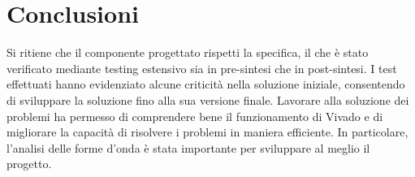 \documentclass{article}
\begin{document}
\section{Conclusioni}

Si ritiene che il componente progettato rispetti la specifica, il che è stato verificato mediante testing estensivo sia in pre-sintesi che in post-sintesi. I test effettuati hanno evidenziato alcune criticità nella soluzione iniziale, consentendo di sviluppare la soluzione fino alla sua versione finale. Lavorare alla soluzione dei problemi ha permesso di comprendere bene il funzionamento di Vivado e di migliorare la capacità di risolvere i problemi in maniera efficiente. In particolare, l'analisi delle forme d'onda è stata importante per sviluppare al meglio il progetto.
\end{document}

